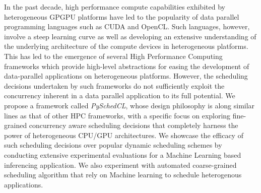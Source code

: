 \documentclass[12pt, a4paper, oneside]{Thesis} %
\begin{document}
{{In the past decade, high performance compute capabilities exhibited by heterogeneous GPGPU platforms have led to the popularity of  data parallel programming languages such as CUDA and OpenCL. Such languages, however,  involve a steep learning curve as well as developing an extensive understanding of the underlying architecture of the compute devices in heterogeneous platforms. This has led to the emergence of several High Performance Computing frameworks which provide high-level abstractions for easing the development of data-parallel applications on heterogeneous platforms. However, the scheduling decisions undertaken by such frameworks do not sufficiently exploit the concurrency inherent in a data parallel application to its full potential. We propose a framework called {\em PySchedCL}, whose design philosophy is along similar lines as that of other HPC frameworks, with a specific focus on exploring fine-grained concurrency aware scheduling decisions that completely harness the power of heterogeneous CPU/GPU architectures. We showcase the efficacy of such scheduling decisions over popular dynamic scheduling schemes by conducting extensive experimental evaluations for a Machine Learning based inferencing application. We also experiment with automated coarse-grained scheduling algorithm that rely on Machine learning to schedule heterogenous applications. 


}

\clearpage %





\acknowledgements{\addtocontents{toc}{}%

I am deeply grateful to my supervisor \textbf{Prof. Soumyajit Dey} who gave me the opportunity to work on this project. I am thankful for his aspiring guidance, invaluably constructive friendly advice during the course of the project. I am sincerely grateful to him for sharing his truthful and illuminating views on a number of issues related to the project. I owe a lot to my teachers in the Department of Computer Science and Engineering, Indian Institute of Technology, Kharagpur, who have instilled in me the scientific spirit of inquiry, experimentation, observation and inference, without which I would not have been able to produce this work. Also, I am very thankful to \textbf{Mr. Anirban Ghose} involved in this project who constantly motivated me to overcome all the challenges and helped me whenever I faced any issues.


}}
\end{document}
